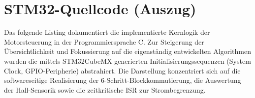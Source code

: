 \section{STM32-Quellcode (Auszug)}
\label{app:software}

Das folgende Listing dokumentiert die implementierte Kernlogik der Motorsteuerung in der Programmiersprache C. Zur Steigerung der Übersichtlichkeit und Fokussierung auf die eigenständig entwickelten Algorithmen wurden die mittels STM32CubeMX generierten Initialisierungssequenzen (System Clock, GPIO-Peripherie) abstrahiert. Die Darstellung konzentriert sich auf die softwareseitige Realisierung der 6-Schritt-Blockkommutierung, die Auswertung der Hall-Sensorik sowie die zeitkritische ISR zur Strombegrenzung.
\\



